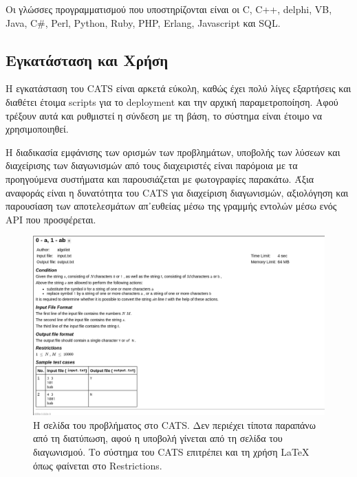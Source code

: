 \documentclass[diploma]{softlab-thesis}
\begin{document}


\bigskip

Οι γλώσσες προγραμματισμού που υποστηρίζονται είναι οι C, C++, delphi, VB, Java,
C\#, Perl, Python, Ruby, PHP, Erlang, Javascript και SQL.

\subsection{Εγκατάσταση και Χρήση}

Η εγκατάσταση του CATS είναι αρκετά εύκολη, καθώς έχει πολύ λίγες εξαρτήσεις
και διαθέτει έτοιμα scripts για το deployment και την αρχική παραμετροποίηση.
Αφού τρέξουν αυτά και ρυθμιστεί η σύνδεση με τη βάση, το σύστημα είναι έτοιμο
να χρησιμοποιηθεί.

\bigskip

Η διαδικασία εμφάνισης των ορισμών των προβλημάτων, υποβολής των λύσεων και
διαχείρισης των διαγωνισμών από τους διαχειριστές είναι παρόμοια με τα προηγούμενα
συστήματα και παρουσιάζεται με φωτογραφίες παρακάτω. Άξια αναφοράς είναι
η δυνατότητα του CATS για διαχείριση διαγωνισμών, αξιολόγηση και παρουσίαση των
αποτελεσμάτων απ᾽ευθείας μέσω της γραμμής εντολών μέσω ενός API που προσφέρεται.

\FloatBarrier

\begin{figure}
  \centering
  \includegraphics[scale=0.45,trim=4 4 4 4,clip]{Figures/catsproblem.png}
  \caption[Διατύπωση προβλήματος CATS]{Η σελίδα του προβλήματος στο CATS. Δεν
  περιέχει τίποτα παραπάνω από τη διατύπωση, αφού η υποβολή γίνεται από τη σελίδα
  του διαγωνισμού. Το σύστημα του CATS επιτρέπει και τη χρήση LaTeX όπως
  φαίνεται στο Restrictions.}
\end{figure}
\end{document}

